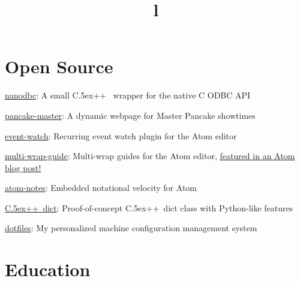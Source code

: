 \documentclass[12pt, tweaklist, line]{res}
\let\tempone\itemize
\let\temptwo\enditemize
\renewenvironment{itemize}{\tempone\vspace{-.15in}\setlength{\topsep}{0pt}\setlength{\itemsep}{3pt}\vspace{-.15in}}{\temptwo}
\def\Cplusplus{{\rm C\raise.5ex\hbox{\small ++}}}
\begin{document}
\begin{resume}
\pagebreak

\vspace{-.17in}
\vtop{\hspace{-.55in} \hsize=6.9in \hrulefill}

\vspace{-.08in}
\section{Open Source}
\begin{itemize}
\vspace{.55in} %
\item \href{http://nanodbc.io}{nanodbc}: A small \Cplusplus~ wrapper for the native C ODBC API
\item \href{http://pancake.lexicalunit.com}{pancake-master}: A dynamic webpage for Master Pancake showtimes
\item \href{https://atom.io/packages/event-watch}{event-watch}: Recurring event watch plugin for the Atom editor
\item \href{https://atom.io/packages/multi-wrap-guide}{multi-wrap-guide}: Multi-wrap guides for the Atom editor, \href{http://blog.atom.io/2015/08/06/new-package-roundup.html}{featured in an Atom blog post!}
\item \href{https://github.com/lexicalunit/atom-notes}{atom-notes}: Embedded notational velocity for Atom
\item \href{https://github.com/lexicalunit/dict}{\Cplusplus~dict}: Proof-of-concept \Cplusplus~dict class with Python-like features
\item \href{https://github.com/lexicalunit/dotfiles}{dotfiles}: My personalized machine configuration management system
\end{itemize}

\section{Education}
\begin{format}
  \\
  \title{l}\\
  \body\\
\end{format}


\end{resume}
\end{document}
